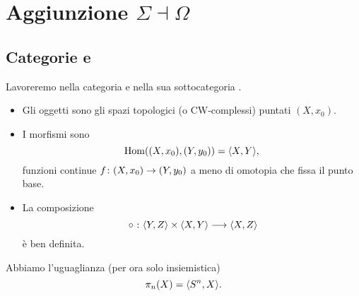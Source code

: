 \section*{Aggiunzione \texorpdfstring{$\Sigma\dashv\Omega$}{Sigma-Omega}}
\subsection*{Categorie \texorpdfstring{}{Top.} e \texorpdfstring{}{CW.}}
\begin{frame*}
Lavoreremo nella categoria  e nella sua sottocategoria .
\begin{itemize}
\item Gli oggetti sono gli spazi topologici (o CW-complessi) puntati $(X,x_0)$.
\item I morfismi sono
\[
\operatorname{Hom}((X,x_0),(Y,y_0))=\langle X,Y\rangle,
\]
funzioni continue $\map{f}{(X,x_0)}{(Y,y_0)}$ a meno di omotopia che fissa il punto base.
\item La composizione
\[
\map{{}\circ{}}{\hmaps{Y,Z}\times\hmaps{X,Y}}{\hmaps{X,Z}}
\]
è ben definita.
\end{itemize}
\begin{example}
Abbiamo l'uguaglianza (per ora solo insiemistica)
\[
\pi_n(X)=\langle S^n,X\rangle.
\]
\end{example}
\end{frame*}

\begin{comment}

\subsection*{Equivalenze omotopiche deboli}
\begin{frame*}
\begin{definition}
Una funzione $\map{f}{X}{Y}$ si dice \emph{equivalenza omotopica debole} se per ogni $n\ge 0$  la mappa indotta
\[
\map{f_*}{\pi_n(X)}{\pi_n(Y)}
\]
è un isomorfismo.
\end{definition}
\begin{proposition}
Siano $X$ un CW-complesso, $\map{f}{Y}{Z}$ un'equivalenza omotopica debole di spazi topologici. Allora
\[
\map{f\circ-}{\hmaps{X,Y}}{\hmaps{X,Z}}
\]
è una biiezione.
\end{proposition}
\begin{theorem}[Approssimazione CW]
Per ogni spazio topologico $X$ esistono un CW-complesso $Z$ e un'equivalenza omotopica debole
$\map{f}{Z}{X}$.
\end{theorem}
\end{frame*}
\end{comment}

